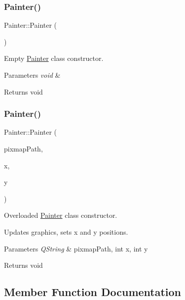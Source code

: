 \subsubsection{\texorpdfstring{Painter()}{Painter()}\hspace{0.1cm}{\footnotesize\ttfamily [1/2]}}
{\footnotesize\ttfamily Painter\+::\+Painter (\begin{DoxyParamCaption}{ }\end{DoxyParamCaption})}



Empty \mbox{\hyperlink{class_painter}{Painter}} class constructor. 


\begin{DoxyParams}{Parameters}
{\em void} & \\
\hline
\end{DoxyParams}
\begin{DoxyReturn}{Returns}
void 
\end{DoxyReturn}
\mbox{\label{class_painter_a8a03ffdfcd500771584e662c1de2ef25}} 
\subsubsection{\texorpdfstring{Painter()}{Painter()}\hspace{0.1cm}{\footnotesize\ttfamily [2/2]}}
{\footnotesize\ttfamily Painter\+::\+Painter (\begin{DoxyParamCaption}\item[{Q\+String}]{pixmap\+Path,  }\item[{int}]{x,  }\item[{int}]{y }\end{DoxyParamCaption})}



Overloaded \mbox{\hyperlink{class_painter}{Painter}} class constructor. 

Updates graphics, sets x and y positions. 
\begin{DoxyParams}{Parameters}
{\em Q\+String} & pixmap\+Path, int x, int y \\
\hline
\end{DoxyParams}
\begin{DoxyReturn}{Returns}
void 
\end{DoxyReturn}


\subsection{Member Function Documentation}
\mbox{\label{class_painter_a37b3c5e56ec8ae79c781a4f022082c5f}} 
